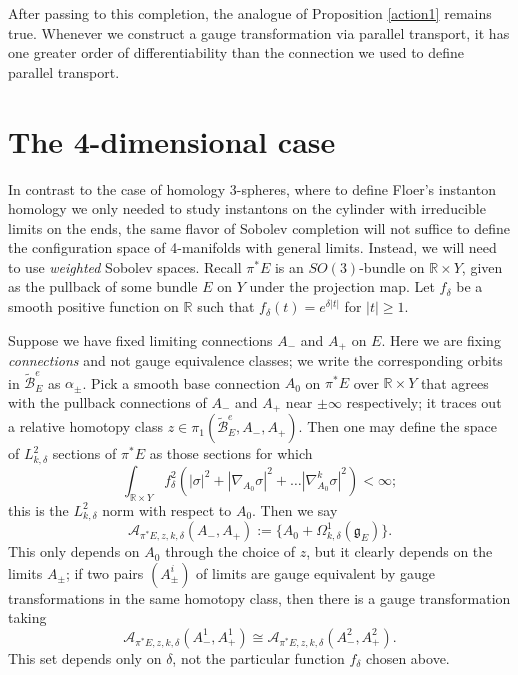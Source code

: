 \documentclass{memo-l}
\newcommand{\pE}{\pi^* \! E}
\theoremstyle{definition}
\theoremstyle{remark}
\numberwithin{section}{chapter}
\numberwithin{equation}{chapter}
\begin{document}
After passing to this completion, the analogue of Proposition \ref{action1} remains true. Whenever we construct a gauge transformation via parallel transport, it has one greater order of differentiability than the connection we used to define parallel transport.

\section{The 4-dimensional case}\label{sec:config-Hilbert-4d}
In contrast to the case of homology 3-spheres, where to define Floer's instanton homology we only needed to study instantons on the cylinder with irreducible limits on the ends, the same flavor of Sobolev completion will not suffice to define the configuration space of 4-manifolds with general limits. Instead, we will need to use \textit{weighted} Sobolev spaces. Recall $\pE$ is an $SO(3)$-bundle on $\mathbb R \times Y$, given as the pullback of some bundle $E$ on $Y$ under the projection map. Let $f_\delta$ be a smooth positive function on $\mathbb R$ such that $f_\delta(t) = e^{\delta|t|}$ for $|t| \geq 1$. 

Suppose we have fixed limiting connections $A_-$ and $A_+$ on $E$. Here we are fixing \emph{connections} and not gauge equivalence classes; we write the corresponding orbits in $\widetilde{\mathcal B}^e_E$ as $\alpha_\pm$. Pick a smooth base connection $A_0$ on $\pE$ over $\mathbb R \times Y$ that agrees with the pullback connections of $A_-$ and $A_+$ near $\pm \infty$ respectively; it traces out a relative homotopy class $z \in \pi_1(\widetilde{\mathcal B}^e_E, A_-, A_+)$. Then one may define the space of $L^2_{k,\delta}$ sections of $\pE$ as those sections for which 
$$\int_{\mathbb R \times Y} f_\delta^2\left(|\sigma|^2 + |\nabla_{A_0}\sigma|^2 + \dots |\nabla_{A_0}^k \sigma|^2\right) < \infty;$$ 
this is the $L^2_{k,\delta}$ norm with respect to $A_0$. Then we say $$\mathcal A_{\pE,z,k,\delta}(A_-, A_+) := \{A_0 + \Omega^1_{k,\delta}(\mathfrak g_E)\}.$$ This only depends on $A_0$ through the choice of $z$, but it clearly depends on the limits $A_\pm$; if two pairs $(A_\pm^i)$ of limits are gauge equivalent by gauge transformations in the same homotopy class, then there is a gauge transformation taking 
$$\mathcal A_{\pE,z,k,\delta}(A^1_-, A^1_+) \cong \mathcal A_{\pE,z,k,\delta}(A^2_-, A^2_+).$$ 
This set depends only on $\delta$, not the particular function $f_\delta$ chosen above. 
\end{document}
